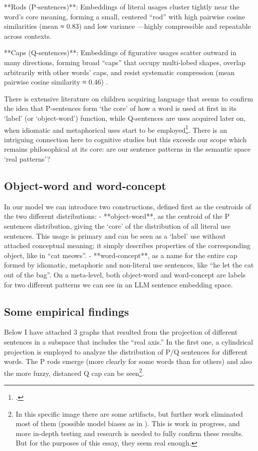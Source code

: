 \documentclass[12pt]{article}
\begin{document}
**Rods (P-sentences)**: Embeddings of literal usages cluster tightly near the word's core meaning, forming a small, centered ``rod'' with high pairwise cosine similarities (mean ≈ 0.83) and low variance \cite{ref-parkGeometry2025}---highly compressible and repeatable across contexts.

**Caps (Q-sentences)**: Embeddings of figurative usages scatter outward in many directions, forming broad ``caps'' that occupy multi-lobed shapes, overlap arbitrarily with other words' caps, and resist systematic compression (mean pairwise cosine similarity ≈ 0.46) \cite{ref-parkGeometry2025}.

There is extensive literature on children acquiring language that seems to confirm the idea that P-sentences form `the core' of how a word is used at first in its `label' (or `object-word') function, while Q-sentences are uses acquired later on, when idiomatic and metaphorical uses start to be employed\footnote{\cite{ref-hollichBreaking2000,ref-prudenBirth2006,ref-seidlTouch2024}.}. There is an intriguing connection here to cognitive studies but this exceeds our scope which remains philosophical at its core: are our sentence patterns in the semantic space `real patterns'?

\subsection{Object-word and word-concept}\label{object-word-and-word-concept}

In our model we can introduce two constructions, defined first as the centroids of the two different distributions:
- **object-word**, as the centroid of the P sentences distribution, giving the `core' of the distribution of all literal use sentences. This usage is primary and can be seen as a `label' use without attached conceptual meaning; it simply describes properties of the corresponding object, like in ``cat meows''.
- **word-concept**, as a name for the entire cap formed by idiomatic, metaphoric and non-literal use sentences, like ``he let the cat out of the bag''. On a meta-level, both object-word and word-concept are labels for two different patterns we can see in an LLM sentence embedding space.

\subsection{Some empirical findings}\label{some-empirical-findings}

Below I have attached 3 graphs that resulted from the projection of different sentences in a subspace that includes the ``real axis.'' In the first one, a cylindrical projection is employed to analyze the distribution of P/Q sentences for different words. The P rods emerge (more clearly for some words than for others) and also the more fuzzy, distanced Q cap can be seen\footnote{In this specific image there are some artifacts, but further work eliminated most of them (possible model biases as in \cite{ref-lavieInfiniteSymmetry2024,ref-vasileiouBiLRP2024,ref-wenPrototype2025}). This is work in progress, and more in-depth testing and research is needed to fully confirm these results. But for the purposes of this essay, they seem real enough.}.
\end{document}
